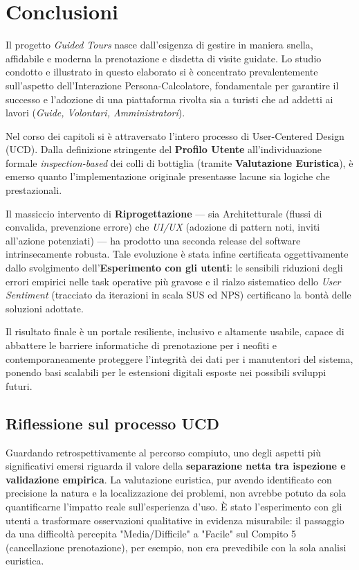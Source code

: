 \chapter{Conclusioni}
\label{ch:conclusioni}

Il progetto \textit{Guided Tours} nasce dall'esigenza di gestire in maniera snella, affidabile e moderna la prenotazione e disdetta di visite guidate. Lo studio condotto e illustrato in questo elaborato si è concentrato prevalentemente sull'aspetto dell'Interazione Persona-Calcolatore, fondamentale per garantire il successo e l'adozione di una piattaforma rivolta sia a turisti che ad addetti ai lavori (\textit{Guide, Volontari, Amministratori}).

Nel corso dei capitoli si è attraversato l'intero processo di User-Centered Design (UCD). Dalla definizione stringente del \textbf{Profilo Utente} all'individuazione formale \textit{inspection-based} dei colli di bottiglia (tramite \textbf{Valutazione Euristica}), è emerso quanto l'implementazione originale presentasse lacune sia logiche che prestazionali.

Il massiccio intervento di \textbf{Riprogettazione} --- sia Architetturale (flussi di convalida, prevenzione errore) che \textit{UI/UX} (adozione di pattern noti, inviti all'azione potenziati) --- ha prodotto una seconda release del software intrinsecamente robusta.
Tale evoluzione è stata infine certificata oggettivamente dallo svolgimento dell'\textbf{Esperimento con gli utenti}: le sensibili riduzioni degli errori empirici nelle task operative più gravose e il rialzo sistematico dello \textit{User Sentiment} (tracciato da iterazioni in scala SUS ed NPS) certificano la bontà delle soluzioni adottate.

Il risultato finale è un portale resiliente, inclusivo e altamente usabile, capace di abbattere le barriere informatiche di prenotazione per i neofiti e contemporaneamente proteggere l'integrità dei dati per i manutentori del sistema, ponendo basi scalabili per le estensioni digitali esposte nei possibili sviluppi futuri.

\section{Riflessione sul processo UCD}

Guardando retrospettivamente al percorso compiuto, uno degli aspetti più significativi emersi riguarda il valore della \textbf{separazione netta tra ispezione e validazione empirica}. La valutazione euristica, pur avendo identificato con precisione la natura e la localizzazione dei problemi, non avrebbe potuto da sola quantificarne l'impatto reale sull'esperienza d'uso. È stato l'esperimento con gli utenti a trasformare osservazioni qualitative in evidenza misurabile: il passaggio da una difficoltà percepita "Media/Difficile" a "Facile" sul Compito 5 (cancellazione prenotazione), per esempio, non era prevedibile con la sola analisi euristica.

